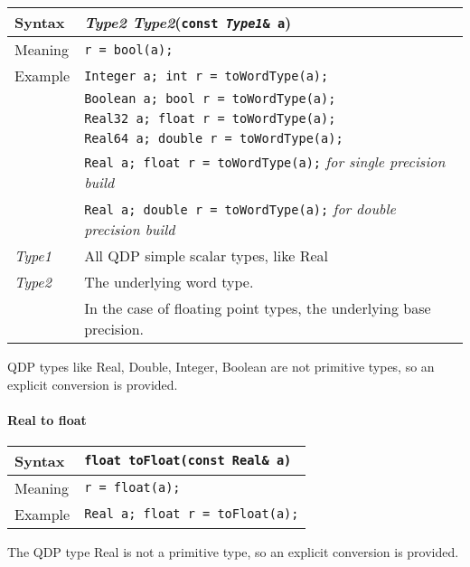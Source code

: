 \documentclass[12pt,letterpaper]{article}
\newcommand{\tReal}{Real}
\newcommand{\tDouble}{Double}
\newcommand{\tInt}{Integer}
\newcommand{\tBoolean}{Boolean}
\begin{document}
\begin{flushleft}
  \begin{tabular}{|l|l|}
  \hline
  Syntax      & {\it Type2 Type2}({\tt const {\it Type1}\& a})\\
  \hline
  Meaning     & \verb|r = bool(a);|\\
  \hline
  Example     & {\tt \tInt{} a; int r = toWordType(a);} \\
              & {\tt \tBoolean{} a; bool r = toWordType(a);} \\
              & {\tt \tReal32{} a; float r = toWordType(a);} \\
              & {\tt \tReal64{} a; double r = toWordType(a);} \\
              & {\tt \tReal{} a; float r = toWordType(a);} {\em for single precision build} \\
              & {\tt \tReal{} a; double r = toWordType(a);} {\em for double precision build} \\
  \hline
  {\it Type1} & All QDP simple scalar types, like \tReal \\
  {\it Type2} & The underlying word type.  \\
              & In the case of floating point types, the underlying base precision. \\
  \hline
  \end{tabular}
\end{flushleft}

QDP types like \tReal{}, \tDouble{}, \tInt, \tBoolean{} are not primitive types, 
so an explicit conversion is provided.

\paragraph{Real to float} 

\begin{flushleft}
  \begin{tabular}{|l|l|}
  \hline
  Syntax      & {\tt float toFloat(const \tReal\& a)} \\
  \hline
  Meaning     & \verb|r = float(a);|\\
  \hline
  Example     & {\tt \tReal{} a; float r = toFloat(a);} \\
  \hline
  \end{tabular}
\end{flushleft}

The QDP type \tReal{} is not a primitive type, so an explicit conversion is provided.
\end{document}
